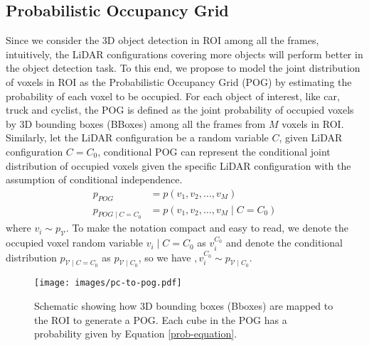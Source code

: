 \documentclass[10pt,twocolumn,letterpaper]{article}
\begin{document}
\subsection{Probabilistic Occupancy Grid}
Since we consider the 3D object detection in ROI among all the frames, intuitively, the LiDAR configurations covering more objects will perform better in the object detection task. To this end, we propose to model the joint distribution of voxels in ROI as the Probabilistic Occupancy Grid (POG) by estimating the probability of each voxel to be occupied. For each object of interest, like car, truck and cyclist, the POG is defined as the joint probability of occupied voxels by 3D bounding boxes (BBoxes) among all the frames from $M$ voxels in ROI. Similarly, let the LiDAR configuration be a random variable $C$, given LiDAR configuration $C=C_0$, conditional POG can represent the conditional joint distribution of occupied voxels given the specific LiDAR configuration with the assumption of conditional independence.
\begin{align}
\label{pog}
p_{POG} &= p(v_1, v_2,\dots,v_M)  \\
\label{pog_C}
p_{POG \mid C=C_0} & = p(v_1, v_2,\dots,v_M \mid C=C_0)
\end{align}
where $v_i \sim  p_{\mathcal{V}}$. To make the notation compact and easy to read, we denote the occupied voxel random variable   $v_i \mid C=C_0  $  as $v_i^{C_0}$ and denote  the conditional distribution $p_{\mathcal{V} \mid C=C_0}$ as $p_{\mathcal{V} \mid C_0}$, so we have $, v_i^{C_0}  \sim p_{\mathcal{V} \mid C_0}$.
\begin{figure}[t!]
\begin{center}
 \texttt{[image: images/pc-to-pog.pdf]}
\end{center}
\vspace*{-8mm}
  \caption{Schematic showing how 3D bounding boxes (Bboxes) are mapped to the ROI to generate a POG. Each cube in the POG has a probability given by Equation {\ref{prob-equation}}.}
\label{fig:pc-to-pog}
\vspace{-13mm}
\end{figure}
\end{document}
